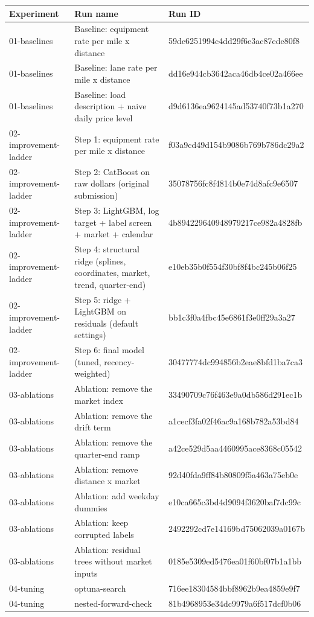 \begin{tabular}{lll}
\toprule
Experiment & Run name & Run ID \\
\midrule
01-baselines & Baseline: equipment rate per mile x distance & 59dc6251994c4dd29f6e3ac87ede80f8 \\
01-baselines & Baseline: lane rate per mile x distance & dd16e944cb3642aca46db4ce02a466ee \\
01-baselines & Baseline: load description + naive daily price level & d9d6136ea9624145ad53740f73b1a270 \\
02-improvement-ladder & Step 1: equipment rate per mile x distance & f03a9cd49d154b9086b769b786dc29a2 \\
02-improvement-ladder & Step 2: CatBoost on raw dollars (original submission) & 35078756fc8f4814b0e74d8afc9e6507 \\
02-improvement-ladder & Step 3: LightGBM, log target + label screen + market + calendar & 4b894229640948979217ce982a4828fb \\
02-improvement-ladder & Step 4: structural ridge (splines, coordinates, market, trend, quarter-end) & e10eb35b0f554f30bf8f4bc245b06f25 \\
02-improvement-ladder & Step 5: ridge + LightGBM on residuals (default settings) & bb1c3f0a4fbc45e6861f3e0ff29a3a27 \\
02-improvement-ladder & Step 6: final model (tuned, recency-weighted) & 30477774dc994856b2eae8bfd1ba7ca3 \\
03-ablations & Ablation: remove the market index & 33490709c76f463e9a0db586d291ec1b \\
03-ablations & Ablation: remove the drift term & a1cecf3fa02f46ac9a168b782a53bd84 \\
03-ablations & Ablation: remove the quarter-end ramp & a42ce529d5aa4460995ace8368c05542 \\
03-ablations & Ablation: remove distance x market & 92d40fda9ff84b80809f5a463a75eb0e \\
03-ablations & Ablation: add weekday dummies & e10ca665c3bd4d9094f3620baf7dc99c \\
03-ablations & Ablation: keep corrupted labels & 2492292cd7e14169bd75062039a0167b \\
03-ablations & Ablation: residual trees without market inputs & 0185e5309ed5476ea01f60bf07b1a1bb \\
04-tuning & optuna-search & 716ee18304584bbf8962b9ea4859e9f7 \\
04-tuning & nested-forward-check & 81b4968953e34dc9979a6f517dcf0b06 \\

\end{tabular}
